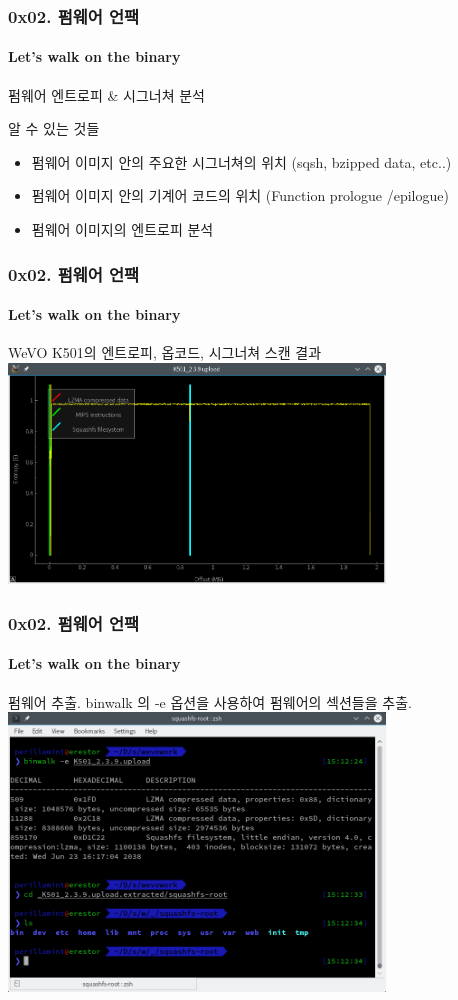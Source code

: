 \documentclass {beamer}
\begin{document}
\begin{frame}
  \frametitle{0x02. 펌웨어 언팩}
  \framesubtitle{Let's walk on the binary}

  펌웨어 엔트로피 \& 시그너쳐 분석

  알 수 있는 것들
  \begin{itemize}
  \item<2-> 펌웨어 이미지 안의 주요한 시그너쳐의 위치 (sqsh, bzipped data, etc..)
  \item<2-> 펌웨어 이미지 안의 기계어 코드의 위치 (Function prologue \slash epilogue)
  \item<2-> 펌웨어 이미지의 엔트로피 분석
  \end{itemize}
\end{frame}

\begin{frame}
  \frametitle{0x02. 펌웨어 언팩}
  \framesubtitle{Let's walk on the binary}

  WeVO K501의 엔트로피, 옵코드, 시그너쳐 스캔 결과
  \includegraphics [width=100mm]{img/WeVO_K501_entropy.png}
\end{frame}

\begin{frame}
  \frametitle{0x02. 펌웨어 언팩}
  \framesubtitle{Let's walk on the binary}

  펌웨어 추출.
  binwalk 의 -e 옵션을 사용하여 펌웨어의 섹션들을 추출.
  \includegraphics [width=100mm]{img/WeVO_K501_extracted.png}
\end{frame}
\end{document}

